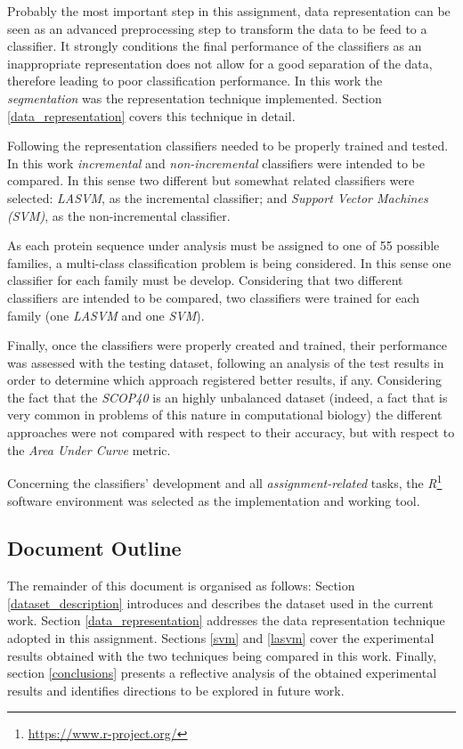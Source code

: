 \documentclass[11pt]{article}
\begin{document}
Probably the most important step in this assignment, data representation can be seen as an advanced preprocessing step to transform the data to be feed to a classifier. It strongly conditions the final performance of the classifiers as an inappropriate representation does not allow for a good separation of the data, therefore leading to poor classification performance. In this work the \emph{segmentation} was the representation technique implemented. Section \ref{data_representation} covers this technique in detail.

Following the representation classifiers needed to be properly trained and tested. In this work \emph{incremental} and \emph{non-incremental} classifiers were intended to be compared. In this sense two different but somewhat related classifiers were selected: \emph{LASVM}, as the incremental classifier; and \emph{Support Vector Machines (SVM)}, as the non-incremental classifier.

As each protein sequence under analysis must be assigned to one of 55 possible families, a multi-class classification problem is being considered. In this sense one classifier for each family must be develop. Considering that two different classifiers are intended to be compared, two classifiers were trained for each family (one \emph{LASVM} and one \emph{SVM}).

Finally, once the classifiers were properly created and trained, their performance was assessed with the testing dataset, following an analysis of the test results in order to determine which approach registered better results, if any. Considering the fact that the \emph{SCOP40} is an highly unbalanced dataset (indeed, a fact that is very common in problems of this nature in computational biology) the different approaches were not compared with respect to their accuracy, but with respect to the \emph{Area Under Curve} metric.

Concerning the classifiers' development and all \emph{assignment-related} tasks, the \emph{R}\footnote{\url{https://www.r-project.org/}} software environment was selected as the implementation and working tool.

\subsection{Document Outline}

The remainder of this document is organised as follows: Section \ref{dataset_description} introduces and describes the dataset used in the current work. Section \ref{data_representation} addresses the data representation technique adopted in this assignment. Sections \ref{svm} and \ref{lasvm} cover the experimental results obtained with the two techniques being compared in this work. Finally, section \ref{conclusions} presents a reflective analysis of the obtained experimental results and identifies directions to be explored in future work.
\end{document}

